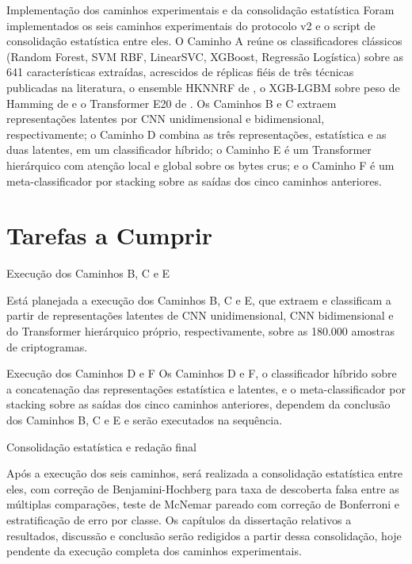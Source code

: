  
 
\begin{tarefac} Implementação dos caminhos experimentais e da consolidação estatística
Foram implementados os seis caminhos experimentais do protocolo v2 e o script de consolidação estatística entre eles. O Caminho A reúne os classificadores clássicos (Random Forest, SVM RBF, LinearSVC, XGBoost, Regressão Logística) sobre as 641 características extraídas, acrescidos de réplicas fiéis de três técnicas publicadas na literatura, o ensemble HKNNRF de \citet{yuan2022}, o XGB-LGBM sobre peso de Hamming de \citet{zhao_hamming_2023} e o Transformer E20 de \citet{yuan_e20_2026}. Os Caminhos B e C extraem representações latentes por CNN unidimensional e bidimensional, respectivamente; o Caminho D combina as três representações, estatística e as duas latentes, em um classificador híbrido; o Caminho E é um Transformer hierárquico com atenção local e global sobre os bytes crus; e o Caminho F é um meta-classificador por stacking sobre as saídas dos cinco caminhos anteriores. 
\end{tarefac}





 
\section{Tarefas a Cumprir}
 \begin{tarefanc}Execução dos Caminhos B, C e E
 
 Está planejada a execução dos Caminhos B, C e E, que extraem e classificam a partir de representações latentes de CNN unidimensional, CNN bidimensional e do Transformer hierárquico próprio, respectivamente, sobre as 180.000 amostras de criptogramas.
\end{tarefanc}

\begin{tarefanc}Execução dos Caminhos D e F
Os Caminhos D e F, o classificador híbrido sobre a concatenação das representações estatística e latentes, e o meta-classificador por stacking sobre as saídas dos cinco caminhos anteriores, dependem da conclusão dos Caminhos B, C e E e serão executados na sequência.
\end{tarefanc}
 
\begin{tarefanc}Consolidação estatística e redação final

Após a execução dos seis caminhos, será realizada a consolidação estatística entre eles, com correção de Benjamini-Hochberg para taxa de descoberta falsa entre as múltiplas comparações, teste de McNemar pareado com correção de Bonferroni e estratificação de erro por classe. Os capítulos da dissertação relativos a resultados, discussão e conclusão serão redigidos a partir dessa consolidação, hoje pendente da execução completa dos caminhos experimentais.
\end{tarefanc}
 


